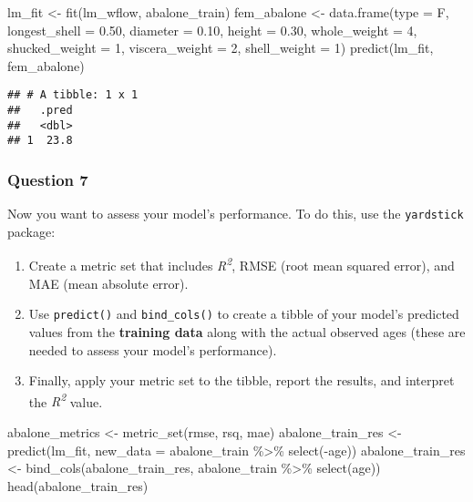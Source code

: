 \documentclass[
]{article}
\newenvironment{Shaded}{\begin{snugshade}}{\end{snugshade}}
\newcommand{\AttributeTok}[1]{\textcolor[rgb]{0.77,0.63,0.00}{#1}}
\newcommand{\DecValTok}[1]{\textcolor[rgb]{0.00,0.00,0.81}{#1}}
\newcommand{\FloatTok}[1]{\textcolor[rgb]{0.00,0.00,0.81}{#1}}
\newcommand{\FunctionTok}[1]{\textcolor[rgb]{0.00,0.00,0.00}{#1}}
\newcommand{\NormalTok}[1]{#1}
\newcommand{\OtherTok}[1]{\textcolor[rgb]{0.56,0.35,0.01}{#1}}
\newcommand{\SpecialCharTok}[1]{\textcolor[rgb]{0.00,0.00,0.00}{#1}}
\newcommand{\StringTok}[1]{\textcolor[rgb]{0.31,0.60,0.02}{#1}}
\providecommand{\tightlist}{%
  \setlength{\itemsep}{0pt}\setlength{\parskip}{0pt}}
\begin{document}
\begin{Shaded}
\begin{Highlighting}[]
\NormalTok{lm\_fit }\OtherTok{\textless{}{-}} \FunctionTok{fit}\NormalTok{(lm\_wflow, abalone\_train)}
\NormalTok{fem\_abalone }\OtherTok{\textless{}{-}} \FunctionTok{data.frame}\NormalTok{(}\AttributeTok{type =} \StringTok{\textquotesingle{}F\textquotesingle{}}\NormalTok{, }\AttributeTok{longest\_shell =} \FloatTok{0.50}\NormalTok{, }\AttributeTok{diameter =} \FloatTok{0.10}\NormalTok{, }\AttributeTok{height =} \FloatTok{0.30}\NormalTok{, }
                          \AttributeTok{whole\_weight =} \DecValTok{4}\NormalTok{, }\AttributeTok{shucked\_weight =} \DecValTok{1}\NormalTok{, }\AttributeTok{viscera\_weight =} \DecValTok{2}\NormalTok{, }\AttributeTok{shell\_weight =} \DecValTok{1}\NormalTok{)}
\FunctionTok{predict}\NormalTok{(lm\_fit, fem\_abalone)}
\end{Highlighting}
\end{Shaded}

\begin{verbatim}
## # A tibble: 1 x 1
##   .pred
##   <dbl>
## 1  23.8
\end{verbatim}

\hypertarget{question-7}{%
\subsubsection{Question 7}\label{question-7}}

Now you want to assess your model's performance. To do this, use the
\texttt{yardstick} package:

\begin{enumerate}
\def\labelenumi{\arabic{enumi}.}
\tightlist
\item
  Create a metric set that includes \emph{R\textsuperscript{2}}, RMSE
  (root mean squared error), and MAE (mean absolute error).
\item
  Use \texttt{predict()} and \texttt{bind\_cols()} to create a tibble of
  your model's predicted values from the \textbf{training data} along
  with the actual observed ages (these are needed to assess your model's
  performance).
\item
  Finally, apply your metric set to the tibble, report the results, and
  interpret the \emph{R\textsuperscript{2}} value.
\end{enumerate}

\begin{Shaded}
\begin{Highlighting}[]
\NormalTok{abalone\_metrics }\OtherTok{\textless{}{-}} \FunctionTok{metric\_set}\NormalTok{(rmse, rsq, mae)}
\NormalTok{abalone\_train\_res }\OtherTok{\textless{}{-}} \FunctionTok{predict}\NormalTok{(lm\_fit, }\AttributeTok{new\_data =}\NormalTok{ abalone\_train }\SpecialCharTok{\%\textgreater{}\%} \FunctionTok{select}\NormalTok{(}\SpecialCharTok{{-}}\NormalTok{age))}
\NormalTok{abalone\_train\_res }\OtherTok{\textless{}{-}} \FunctionTok{bind\_cols}\NormalTok{(abalone\_train\_res, abalone\_train }\SpecialCharTok{\%\textgreater{}\%} \FunctionTok{select}\NormalTok{(age))}
\FunctionTok{head}\NormalTok{(abalone\_train\_res)}
\end{Highlighting}
\end{Shaded}
\end{document}
